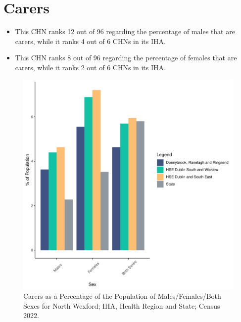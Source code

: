 \documentclass{article}
\begin{document}
\section{Carers}\label{sect:Carers}
\begin{itemize}
\item This CHN ranks  12 out of 96 regarding the percentage of males that are carers, while it ranks   4 out of 6 CHNs in its IHA.
\item This CHN ranks  8 out of 96 regarding the percentage of females that are carers, while it ranks   2 out of 6 CHNs in its IHA.
\end{itemize}
\begin{figure}[H]
	\centering
	\includegraphics[width = 150mm]{../figures/CareED.pdf}
	\caption{Carers as a Percentage of the Population of Males/Females/Both Sexes for North Wexford; IHA, Health Region and State; Census 2022.}
	\label{fig:2ae19629-1a6a-13a3-e055-000000000001}
	\end{figure}
\end{document}
